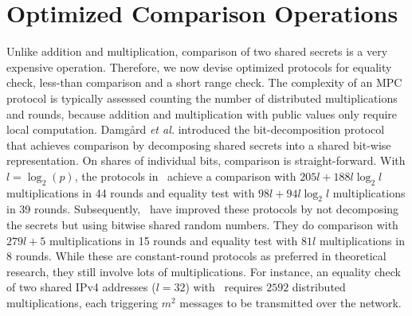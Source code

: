 \documentclass[letterpaper,11pt,onecolumn,titlepage]{article}
\begin{document}
\section{Optimized Comparison Operations} 
\label{sec:comparisons}
Unlike addition and multiplication, comparison of two shared secrets is a very expensive operation. Therefore, we now devise optimized protocols for
equality check, less-than comparison and a short range check. 
The complexity of an MPC protocol is typically assessed counting the number of distributed multiplications and rounds, because addition and multiplication with public values only require local computation. 
Damg{\aa}rd \emph{et al.} introduced the bit-decomposition protocol~\cite{damgard2006bitdecomp} 
that achieves comparison by decomposing shared secrets into a shared bit-wise representation. On shares
of individual bits, comparison is straight-forward. With \mbox{$l=\log_2(p)$}, the protocols in~\cite{damgard2006bitdecomp} achieve a comparison with $205l+188l\log_{2}l$ multiplications in 44 rounds and equality test with $98l+94l\log_{2}l$ multiplications in 39 rounds. 
Subsequently,~\cite{nishide2007nobitdecomp} have improved these protocols by not decomposing the secrets but using bitwise shared random numbers. They 
do comparison with $279l+5$ multiplications in 15 rounds and equality test with $81l$ multiplications in 8 rounds.
While these are constant-round protocols as preferred in theoretical research, they still involve lots of multiplications. For instance, an equality check of two shared IPv4 addresses ($l=32$) with~\cite{nishide2007nobitdecomp} requires $2592$ distributed multiplications, each triggering $m^2$ messages to be transmitted over the network.
\end{document}

